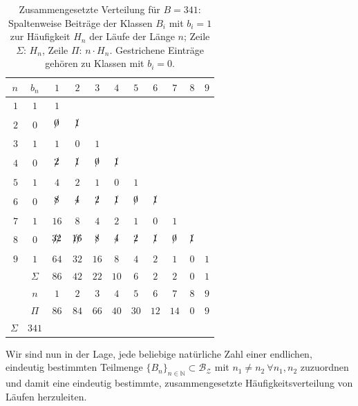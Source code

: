 \documentclass[11pt,a4paper]{scrartcl}
\theoremstyle{plain}
\theoremstyle{definition}
\theoremstyle{remark}
\begin{document}
\begin{table}[htbp]
\centering
\begin{tabular}{rcccccccccc}
\toprule
$n$&$b_n$&$1$&$2$&$3$&$4$&$5$&$6$&$7$&$8$&$9$\\\midrule
$1$&$1$&$ 1$&  &&  &&&& \\
$2$&$0$&$\xout    0$&$\xout  1$&   &&&&& \\
$3$&$1$&$  1$&$  0$&$  1$&&&&& \\
$4$&$0$&$\xout  2$&$\xout  1$&$\xout  0$&$\xout 1$&&&& \\
$5$&$1$&$  4$&$  2$&$  1$&$0$&$1$&&& \\
$6$&$0$&$\xout  8$&$\xout   4$&$\xout  2$&$\xout 1$&$\xout 0$&$\xout 1$&& \\
$7$&$1$&$16$&$  8$&$  4$&$2$&$1$&$0$&$1$& \\
$8$&$0$&$\xout {32}$&$\xout {16}$&$\xout   8$&$\xout 4$&$\xout 2$&$\xout 1$&$\xout 0$&$\xout 1$& \\
$9$&$1$&$64$&$32$&$16$&$8$&$4$&$2$&$1$&$0$&$1$\\\midrule
&$\Sigma$&$86$&$42$&$22$&$10$&$6$&$2$&$2$&$0$&$ 1$\\
&$n$&$1$&$2$&$3$&$4$&$5$&$6$&$7$&$8$&$9$\\
&$\Pi$&$86$&$84$&$66$&$40$&$30$&$12$&$14$&$0$&$9$\\
$\Sigma$&$341$&&&&&&&&&\\
\bottomrule
\end{tabular}
\caption{Zusammengesetzte Verteilung für $B=341$: Spaltenweise
Beiträge der Klassen $B_i$ mit $b_i=1$ zur Häufigkeit $H_n$ der
Läufe der Länge $n$; Zeile $\Sigma$: $H_n$, Zeile $\Pi$:
$n\cdot H_n$. Gestrichene Einträge gehören zu Klassen mit $b_i=0$.}
\label{tab:zusammengesetzt}
\end{table}

\noindent Wir sind nun in der Lage, jede beliebige natürliche Zahl einer
endlichen, eindeutig bestimmten Teilmenge
$\{B_n\}_{n\in\mathbb N} \subset \mathcal{B_Z}$ mit
$n_1\neq n_2\ \forall n_1,n_2$ zuzuordnen und damit eine eindeutig
bestimmte, zusammengesetzte Häufigkeitsverteilung von Läufen
herzuleiten.
\end{document}
